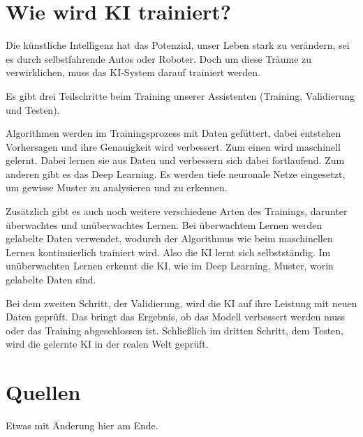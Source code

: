 \documentclass{report}
\begin{document}
\citep{ostfalia-de}

\section{Wie wird KI trainiert?}

Die künstliche Intelligenz hat das Potenzial, unser Leben stark zu verändern, sei es durch selbstfahrende Autos oder Roboter. Doch um diese Träume zu verwirklichen, muss das KI-System darauf trainiert werden.

\vspace{2mm}Es gibt drei Teilschritte beim Training unserer Assistenten (Training, Validierung und Testen). 

\vspace{2mm}Algorithmen werden im Trainingsprozess mit Daten gefüttert, dabei entstehen Vorhersagen und ihre Genauigkeit wird verbessert. Zum einen wird maschinell gelernt. Dabei lernen sie aus Daten und verbessern sich dabei fortlaufend. Zum anderen gibt es das Deep Learning. Es werden tiefe neuronale Netze eingesetzt, um gewisse Muster zu analysieren und zu erkennen.

\vspace{2mm}Zusätzlich gibt es auch noch weitere verschiedene Arten des Trainings, darunter überwachtes und unüberwachtes Lernen. Bei überwachtem Lernen werden gelabelte Daten verwendet, wodurch der Algorithmus wie beim maschinellen Lernen kontinuierlich trainiert wird. Also die KI lernt sich selbstständig. Im unüberwachten Lernen erkennt die KI, wie im Deep Learning, Muster, worin gelabelte Daten sind.

\vspace{2mm}Bei dem zweiten Schritt, der Validierung, wird die KI auf ihre Leistung mit neuen Daten geprüft. Das bringt das Ergebnis, ob das Modell verbessert werden muss oder das Training abgeschlossen ist. Schließlich im dritten Schritt, dem Testen, wird die gelernte KI in der realen Welt geprüft.

\citep{clickworker-de}



\section{Quellen}

Etwas mit Änderung hier am Ende.

\printbibliography
\end{document}

